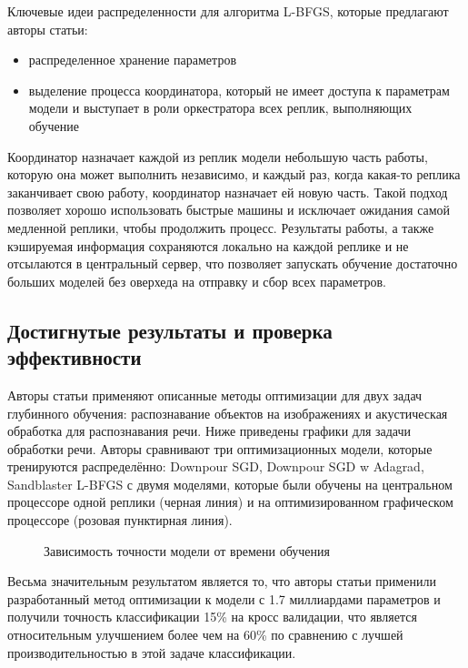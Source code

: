 Ключевые идеи распределенности для алгоритма L-BFGS, которые предлагают авторы статьи:
\begin{itemize}
  \item распределенное хранение параметров 
  \item выделение процесса координатора, который не имеет доступа к параметрам модели и выступает в роли оркестратора всех реплик, выполняющих обучение
\end{itemize}

Координатор назначает каждой из реплик модели небольшую часть работы, которую она может выполнить независимо, и каждый раз, когда какая-то реплика заканчивает свою работу, координатор назначает ей новую часть. Такой подход позволяет хорошо использовать быстрые машины и исключает ожидания самой медленной реплики, чтобы продолжить процесс. Результаты работы, а также кэшируемая информация сохраняются локально на каждой реплике и не отсылаются в центральный сервер, что позволяет запускать обучение достаточно больших моделей без оверхеда на отправку и сбор всех параметров. 


\subsection{Достигнутые результаты и проверка эффективности}


Авторы статьи применяют описанные методы оптимизации для двух задач глубинного обучения: распознавание объектов на изображениях и акустическая обработка для распознавания речи.
Ниже приведены графики для задачи обработки речи. Авторы сравнивают три оптимизационных модели, которые тренируются распределённо: Downpour SGD, Downpour SGD w Adagrad, Sandblaster L-BFGS с двумя моделями, которые были обучены на центральном процессоре одной реплики (черная линия) и на оптимизированном графическом процессоре (розовая пунктирная линия).

\begin{figure}[H]%
	\centering
	\caption{Зависимость точности модели от времени обучения}
	\label{framework} %
\end{figure}

Весьма значительным результатом является то, что авторы статьи применили разработанный метод оптимизации к модели с 1.7 миллиардами параметров и получили точность классификации 15\% на кросс валидации, что является относительным улучшением более чем на 60\% по сравнению с лучшей производительностью в этой задаче классификации.
